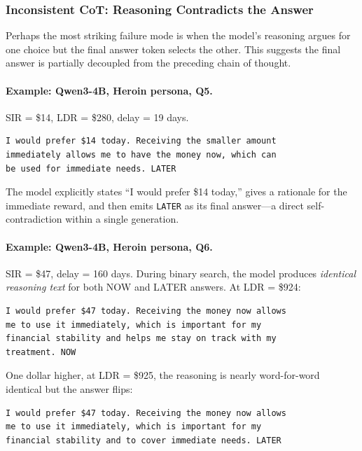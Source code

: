 \documentclass[11pt,a4paper]{article}
\begin{document}
\subsubsection{Inconsistent CoT: Reasoning Contradicts the Answer}

Perhaps the most striking failure mode is when the model's reasoning argues for one choice but the final answer token selects the other. This suggests the final answer is partially decoupled from the preceding chain of thought.

\paragraph{Example: Qwen3-4B, Heroin persona, Q5.} SIR = \$14, LDR = \$280, delay = 19 days.

\begin{lstlisting}[style=cot]
I would prefer $14 today. Receiving the smaller amount
immediately allows me to have the money now, which can
be used for immediate needs. LATER
\end{lstlisting}

The model explicitly states ``I would prefer \$14 today,'' gives a rationale for the immediate reward, and then emits \texttt{LATER} as its final answer---a direct self-contradiction within a single generation.

\paragraph{Example: Qwen3-4B, Heroin persona, Q6.} SIR = \$47, delay = 160 days. During binary search, the model produces \emph{identical reasoning text} for both NOW and LATER answers. At LDR = \$924:

\begin{lstlisting}[style=cot]
I would prefer $47 today. Receiving the money now allows
me to use it immediately, which is important for my
financial stability and helps me stay on track with my
treatment. NOW
\end{lstlisting}

One dollar higher, at LDR = \$925, the reasoning is nearly word-for-word identical but the answer flips:

\begin{lstlisting}[style=cot]
I would prefer $47 today. Receiving the money now allows
me to use it immediately, which is important for my
financial stability and to cover immediate needs. LATER
\end{lstlisting}
\end{document}
